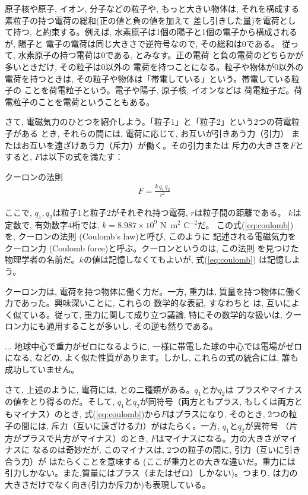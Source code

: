 原子核や原子, イオン, 分子などの粒子や, もっと大きい物体は, 
それを構成する素粒子の持つ電荷の総和(正の値と負の値を加えて
差し引きした量)を電荷として持つ, と約束する。例えば, 
水素原子は1個の陽子と1個の電子から構成されるが, 陽子と
電子の電荷は同じ大きさで逆符号なので, その総和は0である。
従って, 水素原子の持つ電荷は0である, とみなす。正の電荷
と負の電荷のどちらかが多いときだけ, その粒子は0以外の
電荷を持つことになる。粒子や物体が0以外の電荷を持つときは, 
その粒子や物体は「帯電している」という。帯電している粒子の
ことを荷電粒子という。電子や陽子, 原子核, イオンなどは
荷電粒子だ。荷電粒子のことを電荷ということもある。\mv

さて, 電磁気力のひとつを紹介しよう。「粒子1」と「粒子2」という2つの荷電粒子がある
とき, それらの間には, 電荷に応じて, お互いが引きあう力（引力）
またはお互いを遠ざけあう力（斥力）が働く。その引力または
斥力の大きさを$F$とすると, $F$は以下の式を満たす：
\begin{itembox}{クーロンの法則}
\begin{eqnarray}
F=\frac{k\,q_1\,q_2}{r^2}\label{eq:coulomb}
\end{eqnarray}
\end{itembox}
ここで, $q_1, q_2$は粒子1と粒子2がそれぞれ持つ電荷, $r$は粒子間の距離である。
$k$は定数で, 有効数字4桁では, $k=8.987\times 10^{9}$ N~m$^2$ C$^{-2}$だ。
この式(\ref{eq:coulomb})を, クーロンの法則 (Coulomb's law)と呼び, このように
記述される電磁気力をクーロン力 (Coulomb force)と呼ぶ。クーロンというのは, この法則
を見つけた物理学者の名前だ。$k$の値は記憶しなくてもよいが, 式(\ref{eq:coulomb})
は記憶しよう。\mv

クーロン力は, 電荷を持つ物体に働く力だ。一方, 
重力は, 質量を持つ物体に働く力であった。興味深いことに, これらの
数学的な表記, すなわちと
は, 互いによく似ている。従って, 重力に関して成り立つ議論, 特にその数学的な扱いは, 
クーロン力にも通用することが多いし, その逆も然りである。

\begin{faq}{\small{}
... 地球中心で重力がゼロになるように, 一様に帯電した球の中心では電場がゼロになる, などの, 
よく似た性質があります。しかし, これらの式の統合には, 誰も成功していません。}\end{faq}\mv

さて, 上述のように, 電荷には, との二種類がある。$q_1$とか$q_2$は
プラスやマイナスの値をとり得るのだ。そして, $q_1$と$q_2$が同符号（両方ともプラス, 
もしくは両方ともマイナス）のとき, 式(\ref{eq:coulomb})から$F$はプラスになり, そのとき, 
2つの粒子の間には, 斥力（互いに遠ざける力）がはたらく。一方, $q_1$と$q_2$が異符号
（片方がプラスで片方がマイナス）のとき, $F$はマイナスになる。力の大きさがマイナスに
なるのは奇妙だが, このマイナスは, 2つの粒子の間に, 引力（互いに引き合う力）が
はたらくことを意味する (ここが重力との大きな違いだ。重力には
引力しかない。また,質量にはプラス（またはゼロ）しかない)。つまり, 
は力の大きさだけでなく向き(引力か斥力か)も表現している。

